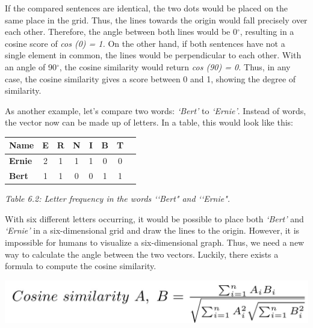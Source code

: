 If the compared sentences are identical, the two dots would be placed on the same place in the grid. Thus, the lines towards the origin would fall precisely over each other. Therefore, the angle between both lines would be 0$^{\circ}$, resulting in a cosine score of \textit{cos (0) = 1.} On the other hand, if both sentences have not a single element in common, the lines would be perpendicular to each other. With an angle of 90$^{\circ}$, the cosine similarity would return \textit{cos (90) = 0.} Thus, in any case, the cosine similarity gives a score between 0 and 1, showing the degree of similarity. 

As another example, let’s compare two words: \textit{‘Bert’} to \textit{‘Ernie’}. Instead of words, the vector now can be made up of letters. In a table, this would look like this:

\begin{center}
\begin{tabular}{|l|c|c|c|c|c|c|c|}
\hline
{\bf Name} & {\bf E} & {\bf R} & {\bf N} & {\bf I} & {\bf B} & {\bf T} \\
\hline
{\bf Ernie} & 2 & 1 & 1 & 1 & 0 & 0\\
{\bf Bert} & 1 & 1 & 0 & 0  & 1 & 1 \\
\hline
\end{tabular}

{\it \footnotesize Table 6.2: Letter frequency in the words \lq\lq Bert" and \lq\lq Ernie".}
\end{center}

\noindent With six different letters occurring, it would be possible to place both \textit{‘Bert’} and \textit{‘Ernie’} in a six-dimensional grid and draw the lines to the origin. However, it is impossible for humans to visualize a six-dimensional graph. Thus, we need a new way to calculate the angle between the two vectors. Luckily, there exists a formula to compute the cosine similarity. 

\begin{center}
\includegraphics[scale=0.2]{./Images/cosine.jpeg}
\end{center}

%

